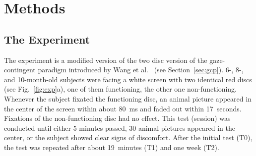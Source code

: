 \documentclass[a4paper]{scrreprt}
\begin{document}
\chapter{Methods}
\label{ch:method}

\section{The Experiment}
\label{sec:met_experiment}

The experiment is a modified version of the two disc version of the gaze-contingent paradigm introduced by Wang et al.~\cite{wang12} (see Section~\ref{sec:gcp}). 6-, 8-, and 10-month-old subjects were facing a white screen with two identical red discs (see Fig.~\ref{fig:exp}a), one of them functioning, the other one non-functioning. Whenever the subject fixated the functioning disc, an animal picture appeared in the center of the screen within about 80~ms and faded out within 17~seconds. Fixations of the non-functioning disc had no effect. This test (session) was conducted until either 5 minutes passed, 30 animal pictures appeared in the center, or the subject showed clear signs of discomfort. After the initial test (T0), the test was repeated after about 19~minutes (T1) and one week (T2).
\end{document}
